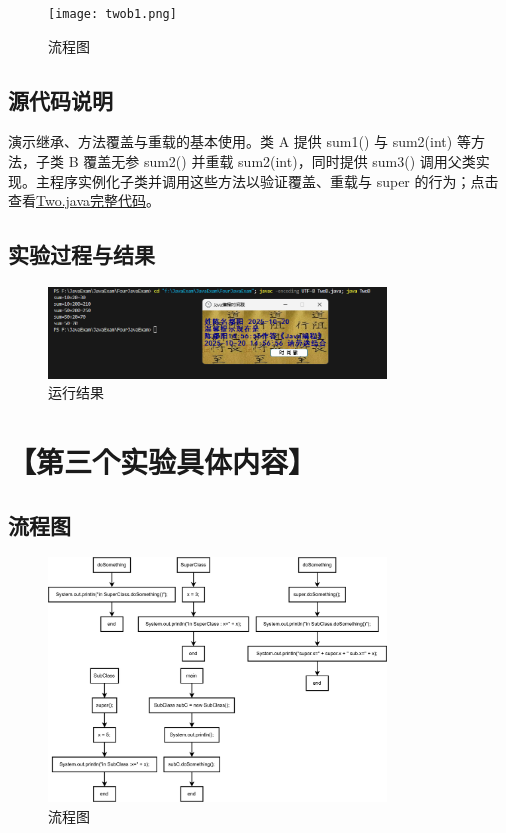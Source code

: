 \documentclass[12pt,a4paper]{article}
\begin{document}
\begin{figure}[H]
\centering
\texttt{[image: twob1.png]}
\caption{流程图}
\end{figure}

\subsection*{源代码说明}
演示继承、方法覆盖与重载的基本使用。类 A 提供 sum1() 与 sum2(int) 等方法，子类 B 覆盖无参 sum2() 并重载 sum2(int)，同时提供 sum3() 调用父类实现。主程序实例化子类并调用这些方法以验证覆盖、重载与 super 的行为；点击查看\hyperref[sec:two]{Two.java完整代码}。

\subsection*{实验过程与结果}

\begin{figure}[H]
\centering
\includegraphics[width=0.8\textwidth]{twob.png}
\caption{运行结果}
\end{figure}

\section*{【第三个实验具体内容】}
\subsection*{流程图}

\begin{figure}[H]
\centering
\includegraphics[width=0.8\textwidth]{threeb1.png}
\caption{流程图}
\end{figure}
\end{document}

